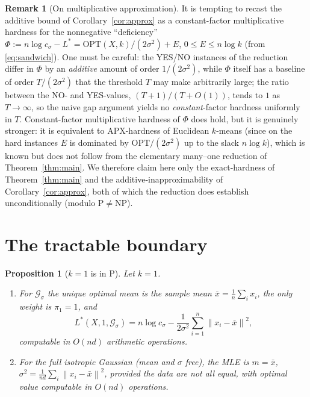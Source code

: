 \documentclass{amsart}
\theoremstyle{plain}
\newtheorem{proposition}{Proposition}
\theoremstyle{definition}
\newtheorem{remark}{Remark}
\newcommand{\norm}[1]{\left\lVert #1 \right\rVert}
\begin{document}
\begin{remark}[On multiplicative approximation]\label{rem:mult}
It is tempting to recast the additive bound of Corollary~\ref{cor:approx} as a
constant-factor multiplicative hardness for the nonnegative ``deficiency''
$\Phi:=n\log c_{\sigma}-L^{\ast}=\mathrm{OPT}(X,k)/(2\sigma^{2})+E$, $0\le E\le
n\log k$ (from \eqref{eq:sandwich}). One must be careful: the YES/NO instances of
the reduction differ in $\Phi$ by an \emph{additive} amount of order
$1/(2\sigma^{2})$, while $\Phi$ itself has a baseline of order
$T/(2\sigma^{2})$ that the threshold $T$ may make arbitrarily large; the ratio
between the NO- and YES-values, $(T+1)/(T+O(1))$, tends to $1$ as $T\to\infty$, so
the naive gap argument yields no \emph{constant}-factor hardness uniformly in $T$.
Constant-factor multiplicative hardness of $\Phi$ does hold, but it is genuinely
stronger: it is equivalent to APX-hardness of Euclidean $k$-means (since on the
hard instances $E$ is dominated by $\mathrm{OPT}/(2\sigma^{2})$ up to the slack
$n\log k$), which is known \cite{ACKS} but does not follow from the elementary
many--one reduction of Theorem~\ref{thm:main}. We therefore claim here only the
exact-hardness of Theorem~\ref{thm:main} and the additive-inapproximability of
Corollary~\ref{cor:approx}, both of which the reduction does establish
unconditionally (modulo $\mathrm{P}\ne\mathrm{NP}$).
\end{remark}

\section{The tractable boundary}

\begin{proposition}[$k=1$ is in P]\label{prop:k1}
Let $k=1$.
\begin{enumerate}
\item[(i)] For $\mathcal G_{\sigma}$ the unique optimal mean is the sample mean
$\bar x=\frac1n\sum_{i}x_{i}$, the only weight is $\pi_{1}=1$, and
\[
L^{\ast}(X,1,\mathcal G_{\sigma})=n\log c_{\sigma}-\frac{1}{2\sigma^{2}}\sum_{i=1}^{n}\norm{x_{i}-\bar x}^{2},
\]
computable in $O(nd)$ arithmetic operations.
\item[(ii)] For the full isotropic Gaussian (mean and $\sigma$ free), the MLE is
$m=\bar x$, $\sigma^{2}=\frac{1}{nd}\sum_{i}\norm{x_{i}-\bar x}^{2}$, provided the
data are not all equal, with optimal value computable in $O(nd)$ operations.
\end{enumerate}
\end{proposition}
\end{document}
